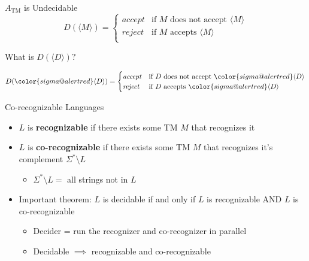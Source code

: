 \documentclass[aspectratio=169]{beamer}
\begin{document}
\begin{frame}{$A_{\text{TM}}$ is Undecidable}
    $$ D(\langle M \rangle) = 
        \begin{cases}
            \mathit{accept} & \text{if $M$ does not accept $\langle M \rangle$} \\
            \mathit{reject} & \text{if $M$ accepts $\langle M \rangle$} \\
        \end{cases}
    $$ \pause
    
    What is $D(\langle D \rangle)?$
    
    $$ D({\color{sigma@alertred} \langle D \rangle}) = 
        \begin{cases}
            \mathit{accept} & \text{if $D$ does not accept ${\color{sigma@alertred} \langle D \rangle}$} \\
            \mathit{reject} & \text{if $D$ accepts ${\color{sigma@alertred} \langle D \rangle}$} \\
        \end{cases}
    $$
\end{frame}

\begin{frame}{Co-recognizable Languages}
    \begin{itemize}
        \item $L$ is \textbf{recognizable} if there exists some TM $M$ that recognizes it \pause
        \item $L$ is \textbf{co-recognizable} if there exists some TM $M$ that recognizes it's complement $\Sigma^* \setminus L$ 
        \begin{itemize}
            \item $\Sigma^* \setminus L = $ all strings not in $L$
        \end{itemize} \pause
        \item Important theorem: $L$ is decidable if and only if $L$ is recognizable AND $L$ is co-recognizable
        \begin{itemize}
            \item Decider = run the recognizer and co-recognizer in parallel
            \item Decidable $\implies$ recognizable and co-recognizable
        \end{itemize}
    \end{itemize}
\end{frame}
\end{document}
